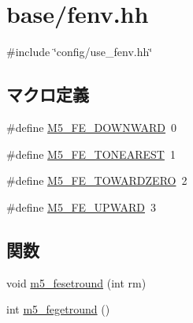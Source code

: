 \hypertarget{fenv_8hh}{
\section{base/fenv.hh}
\label{fenv_8hh}
}
{\ttfamily \#include \char`\"{}config/use\_\-fenv.hh\char`\"{}}\par
\subsection*{マクロ定義}
\begin{DoxyCompactItemize}
\item 
\#define \hyperlink{fenv_8hh_a2f31df845f91d01bf7a00d35d2d6bdd8}{M5\_\-FE\_\-DOWNWARD}~0
\item 
\#define \hyperlink{fenv_8hh_a45ef7495cf3acb087c6e51c0872cb046}{M5\_\-FE\_\-TONEAREST}~1
\item 
\#define \hyperlink{fenv_8hh_a767c086da61e8f4503ff8bcbf63d2047}{M5\_\-FE\_\-TOWARDZERO}~2
\item 
\#define \hyperlink{fenv_8hh_a38de364735346e2242bd897024811e6c}{M5\_\-FE\_\-UPWARD}~3
\end{DoxyCompactItemize}
\subsection*{関数}
\begin{DoxyCompactItemize}
\item 
void \hyperlink{fenv_8hh_a60d890aa65281f81b2b9e7c7583dde08}{m5\_\-fesetround} (int rm)
\item 
int \hyperlink{fenv_8hh_adfea66c9f7f222a8602303b7380bf8c2}{m5\_\-fegetround} ()
\end{DoxyCompactItemize}


